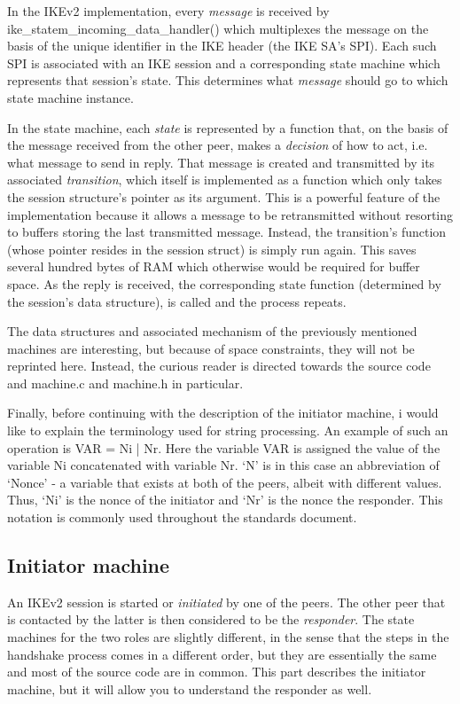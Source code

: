 \documentclass[final,a4paper,twoside,11pt,onecolumn]{report}
\begin{document}
In the IKEv2 implementation, every \emph{message} is received by ike\_\-statem\_\-incoming\_\-data\_\-handler() which multiplexes the message on the basis of the unique identifier in the IKE header (the IKE SA's SPI). Each such SPI is associated with an IKE session and a corresponding state machine which represents that session's state. This determines what \emph{message} should go to which state machine instance.

In the state machine, each \emph{state} is represented by a function that, on the basis of the message received from the other peer, makes a \emph{decision} of how to act, i.e. what message to send in reply. That message is created and transmitted by its associated \emph{transition}, which itself is implemented as a function which only takes the session structure's pointer as its argument. This is a powerful feature of the implementation because it allows a message to be retransmitted without resorting to buffers storing the last transmitted message. Instead, the transition's function (whose pointer resides in the session struct) is simply run again. This saves several hundred bytes of RAM which otherwise would be required for buffer space. As the reply is received, the corresponding state function (determined by the session's data structure), is called and the process repeats.

The data structures and associated mechanism of the previously mentioned machines are interesting, but because of space constraints, they will not be reprinted here. Instead, the curious reader is directed towards the source code and machine.c and machine.h in particular.

Finally, before continuing with the description of the initiator machine, i would like to explain the terminology used for string processing. An example of such an operation is VAR = Ni | Nr. Here the variable VAR is assigned the value of the variable Ni concatenated with variable Nr. `N' is in this case an abbreviation of `Nonce' - a variable that exists at both of the peers, albeit with different values. Thus, `Ni' is the nonce of the initiator and `Nr' is the nonce the responder. This notation is commonly used throughout the standards document.


\subsection{Initiator machine}
An IKEv2 session is started or \emph{initiated} by one of the peers. The other peer that is contacted by the latter is then considered to be the \emph{responder}. The state machines for the two roles are slightly different, in the sense that the steps in the handshake process comes in a different order, but they are essentially the same and most of the source code are in common. This part describes the initiator machine, but it will allow you to understand the responder as well.
\end{document}
